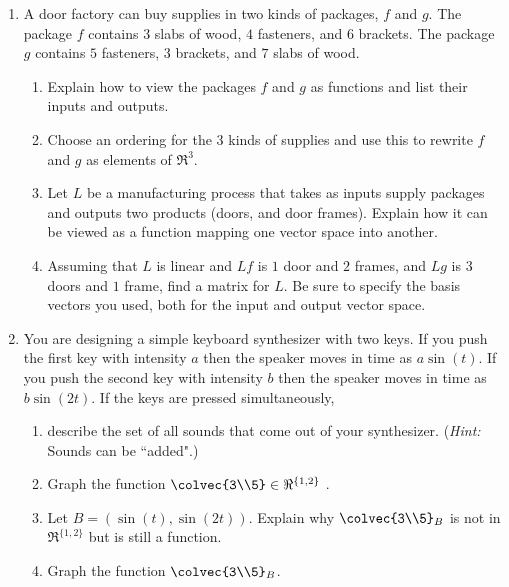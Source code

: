 


\begin{enumerate}

\item A door factory can buy supplies in two kinds of packages, $f$ and $g$. 
The package $f$ contains $3$ slabs of wood, $4$ fasteners, and $6$ brackets. 
The package $g$ contains $5$ fasteners, $3$ brackets, and $7$ slabs of wood. 
\begin{enumerate}
\item Explain how to view the packages $f$ and $g$ as functions and list their inputs and outputs. \\
\item Choose  an ordering for  the 3 kinds of supplies and use this to  rewrite $f$ and $g$ as elements of $\Re^3$.\\
\item Let $L$ be a manufacturing process that takes as inputs supply packages and outputs two products (doors, and door frames). Explain how it  can be viewed as a function 
mapping one vector space into another. 
\item
Assuming that $L$ is linear and  $Lf$ is $1$ door and $2$ frames, and $Lg$ is $3$ doors and $1$ frame, find a matrix for $L$. Be sure to specify the basis vectors you used, both for the input and output vector space.
\end{enumerate}


\item You are designing a simple keyboard synthesizer with two keys. 
If you push the first key with intensity $a$ then the speaker moves in time as $a\sin(t)$.
If you push the second key with intensity $b$ then the speaker moves in time as $b\sin(2t)$. 
If the keys are pressed simultaneously, \\
\begin{enumerate}
\item describe the set of all sounds that come out of your synthesizer. 
({\it Hint:} Sounds can be ``added".)\\
\item  Graph the  function $\colvec{3\\5}\in \Re^{\{1,2\}}$ .
\item Let $B=(\sin(t), \sin(2t))$. 
Explain why $\colvec{3\\5}_B$ is not in $\Re^{\{1,2\}}$ but is still a function.
\item Graph the function $\colvec{3\\5}_B$.
\end{enumerate}


\end{enumerate}
